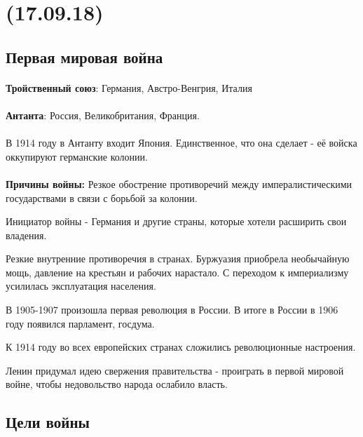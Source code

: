 \documentclass[dvipdfmx]{article}
\begin{document}
\noindent\makebox[\linewidth]{\rule{\paperwidth}{0.4pt}}
\section{(17.09.18)}
\noindent\makebox[\linewidth]{\rule{\paperwidth}{0.4pt}}

\subsection{Первая мировая война}
\paragraph{}
\textbf{Тройственный союз}: Германия, Австро-Венгрия, Италия
\paragraph{}
\textbf{Антанта}: Россия, Великобритания, Франция.
\paragraph{}

В 1914 году в Антанту входит Япония. Единственное, что она сделает - её войска оккупируют германские колонии.

\paragraph{}

\textbf{Причины войны:}
Резкое обострение противоречий между импералистическими государствами в связи с борьбой за колонии.

Инициатор войны - Германия и другие страны, которые хотели расширить свои владения.

Резкие внутренние противоречия в странах. Буржуазия приобрела необычайную мощь, давление на крестьян и рабочих нарастало.
С переходом к империализму усилилась эксплуатация населения.

В 1905-1907 произошла первая революция в России. В итоге в России в 1906 году появился парламент, госдума.

К 1914 году во всех европейских странах сложились революционные настроения.

Ленин придумал идею свержения правительства - проиграть в первой мировой войне, чтобы недовольство народа ослабило власть.

\subsection{Цели войны}
\end{document}
